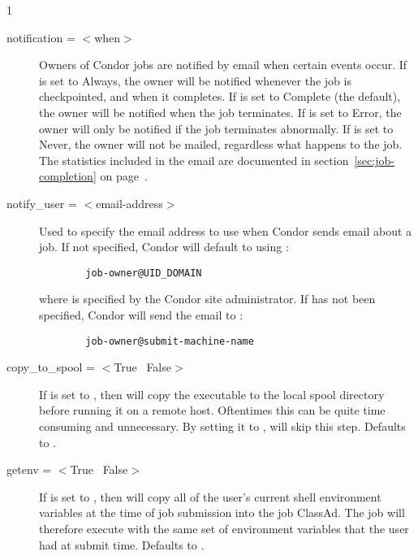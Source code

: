 \begin{ManPage}{\label{man-condor-submit}}{1}
\begin{description}

\item[notification = $<$when$>$]\label{man-condor-submit-notification} Owners of Condor jobs are notified by
email when certain events occur.
If  is set to \mbox{Always}, the owner will be notified
whenever the job is checkpointed, and when it completes.
If  is set to \mbox{Complete} (the default), the owner will
be notified when the job terminates.
If  is set to \mbox{Error}, the owner will only be notified
if the job terminates abnormally.
If  is set to \mbox{Never}, the owner will not be mailed,
regardless what happens to the job.
The statistics included in the email are documented in
section~\ref{sec:job-completion} on
page~\pageref{sec:job-completion}.


\item[notify\_user = $<$email-address$>$]\label{man-condor-submit-notify-user} Used to specify the email
address to use when Condor sends email about a job.  If not specified,
Condor will default to using :
\begin{verbatim}
        job-owner@UID_DOMAIN
\end{verbatim}
where  is specified by the Condor site administrator.  If 
 has not been specified, Condor will send the email
to :
\begin{verbatim}
        job-owner@submit-machine-name
\end{verbatim}


\item[copy\_to\_spool = $<$True \Bar\ False$>$] If  is set to
, then  will copy the executable to the local spool 
directory before running it on a remote host. Oftentimes this can be quite
time consuming and unnecessary. By setting it to , 
will skip this step.  Defaults to .


\item[getenv = $<$True \Bar\ False$>$] If  is set to
, then  will copy all of the user's current
shell environment variables at the time of job submission into the job
ClassAd. The job will therefore execute with the same set of environment
variables that the user had at submit time. Defaults to .


\end{description}
\end{ManPage}
